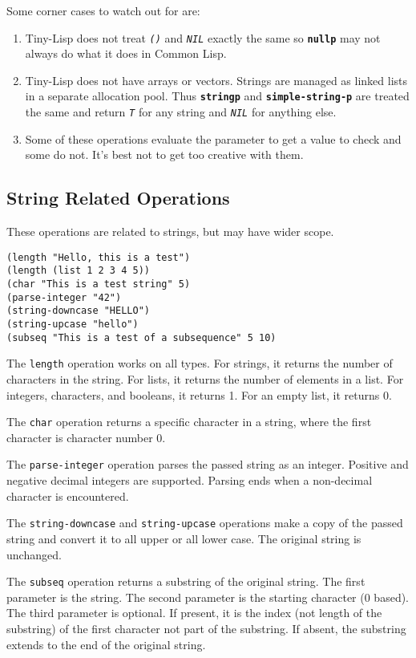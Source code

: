 \documentclass[10pt, openany]{book}
\newcommand{\operation}[1]{\textbf{\texttt{#1}}}
\newcommand{\function}[1]{\texttt{#1}}
\newcommand{\constant}[1]{\emph{\texttt{#1}}}
\newcommand{\tl}{Tiny-Lisp}
\newcommand{\cl}{Common Lisp}
\begin{document}
Some corner cases to watch out for are:
\begin{enumerate}
  \item \tl{} does not treat \constant{()} and \constant{NIL} exactly the same so \operation{nullp} may not always do what it does in \cl.
  \item \tl{} does not have arrays or vectors.  Strings are managed as linked lists in a separate allocation pool.  Thus \operation{stringp} and \operation{simple-string-p} are treated the same and return \constant{T} for any string and \constant{NIL} for anything else.
  \item Some of these operations evaluate the parameter to get a value to check and some do not.  It's best not to get too creative with them.
\end{enumerate}

\subsection{String Related Operations}
These operations are related to strings, but may have wider scope.
\begin{lstlisting}
(length "Hello, this is a test")
(length (list 1 2 3 4 5))
(char "This is a test string" 5)
(parse-integer "42")
(string-downcase "HELLO")
(string-upcase "hello")
(subseq "This is a test of a subsequence" 5 10)
\end{lstlisting}

The \function{length} operation works on all types.  For strings, it returns the number of characters in the string.  For lists, it returns the number of elements in a list.  For integers, characters, and booleans, it returns 1.  For an empty list, it returns 0.

The \function{char} operation returns a specific character in a string, where the first character is character number 0.

The \function{parse-integer} operation parses the passed string as an integer.  Positive and negative decimal integers are supported.  Parsing ends when a non-decimal character is encountered.

The \function{string-downcase} and \function{string-upcase} operations make a copy of the passed string and convert it to all upper or all lower case.  The original string is unchanged.

The \function{subseq} operation returns a substring of the original string.  The first parameter is the string.  The second parameter is the starting character (0 based).  The third parameter is optional.  If present, it is the index (not length of the substring) of the first character  not part of the substring.  If absent, the substring extends to the end of the original string.
\end{document}
